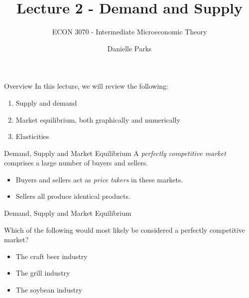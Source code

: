 \documentclass[12pt,t]{beamer}
\author{Danielle Parks}
\title{Lecture 2 - Demand and Supply}
\subtitle{ECON 3070 - Intermediate Microeconomic Theory}
\begin{document}
\begin{frame}
  \titlepage
\end{frame}

\begin{frame}{Overview}
  In this lecture, we will review the following:
  \begin{enumerate}
    \item Supply and demand

    \item Market equilibrium, both graphically and numerically

    \item Elasticities
  \end{enumerate}
\end{frame}

\begin{frame}{Demand, Supply and Market Equilibrium}
  A \textit{perfectly competitive market} comprises a large number of buyers and sellers.
  \begin{itemize}
    \item Buyers and sellers act as \textit{price takers} in these markets.
    \item Sellers all produce identical products.
  \end{itemize}
\end{frame}

\begin{frame}{Demand, Supply and Market Equilibrium}

\bigskip
Which of the following would most likely be considered a perfectly competitive market?

\bigskip
  \begin{itemize}
    \item The craft beer industry
    \item The grill industry
    \item The soybean industry
  \end{itemize}
\end{frame}
\end{document}
